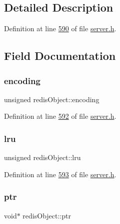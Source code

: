 \subsection{Detailed Description}


Definition at line \hyperlink{server_8h_source_l00590}{590} of file \hyperlink{server_8h_source}{server.\+h}.



\subsection{Field Documentation}
\mbox{\label{structredisObject_a0d8afcc7231d2741ed0d03de1e4db170}} 
\subsubsection{\texorpdfstring{encoding}{encoding}}
{\footnotesize\ttfamily unsigned redis\+Object\+::encoding}



Definition at line \hyperlink{server_8h_source_l00592}{592} of file \hyperlink{server_8h_source}{server.\+h}.

\mbox{\label{structredisObject_aa8b713f8af4c49db1d70d646a11d2280}} 
\subsubsection{\texorpdfstring{lru}{lru}}
{\footnotesize\ttfamily unsigned redis\+Object\+::lru}



Definition at line \hyperlink{server_8h_source_l00593}{593} of file \hyperlink{server_8h_source}{server.\+h}.

\mbox{\label{structredisObject_afd47ef25b9b334ae5e18fbc56751e894}} 
\subsubsection{\texorpdfstring{ptr}{ptr}}
{\footnotesize\ttfamily void$\ast$ redis\+Object\+::ptr}



